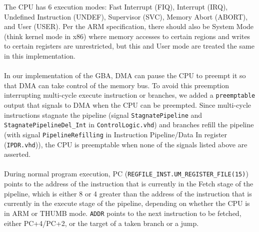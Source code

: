 \documentclass[11pt,a4paper]{article}
\begin{document}
	The CPU has 6 execution modes: Fast Interrupt (FIQ), Interrupt (IRQ), Undefined Instruction (UNDEF), Supervisor (SVC), Memory Abort (ABORT), and User (USER). Per the ARM specification, there should also be System Mode (think kernel mode in x86) where memory accesses to certain regions and writes to certain registers are unrestricted, but this and User mode are treated the same in this implementation.\\\\
	In our implementation of the GBA, DMA can pause the CPU to preempt it so that DMA can take control of the memory bus. To avoid this preemption interrupting multi-cycle execute instruction or branches, we added a \texttt{preemptable} output that signals to DMA when the CPU can be preempted. Since multi-cycle instructions stagnate the pipeline (signal \texttt{StagnatePipeline} and \texttt{StagnatePipelineDel\_Int} in \texttt{ControlLogic.vhd}) and branches refill the pipeline (with signal \texttt{PipelineRefilling} in Instruction Pipeline/Data In register (\texttt{IPDR.vhd})), the CPU is preemptable when none of the signals listed above are asserted.\\\\
	During normal program execution, PC (\texttt{REGFILE\_INST.UM\_REGISTER\_FILE(15)}) points to the address of the instruction that is currently in the Fetch stage of the pipeline, which is either 8 or 4 greater than the address of the instruction that is currently in the execute stage of the pipeline, depending on whether the CPU is in ARM or THUMB mode. \texttt{ADDR} points to the next instruction to be fetched, either PC+4/PC+2, or the target of a taken branch or a jump.\\
	
\end{document}
